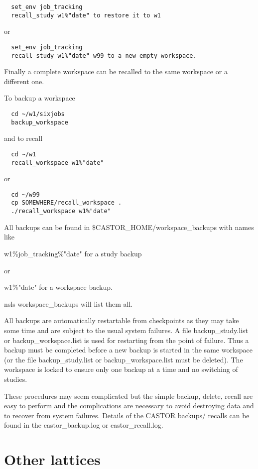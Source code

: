 \documentclass{cernatsnote}    %
\begin{document}
\begin{verbatim}
  set_env job_tracking
  recall_study w1%"date" to restore it to w1 
\end{verbatim}
or 
\begin{verbatim}
  set_env job_tracking
  recall_study w1%"date" w99 to a new empty workspace.
\end{verbatim}

 Finally a complete workspace can be recalled to the same workspace or a
different one.

To backup a workspace
\begin{verbatim} 
  cd ~/w1/sixjobs 
  backup_workspace
\end{verbatim}

and to recall
\begin{verbatim}
  cd ~/w1
  recall_workspace w1%"date"
\end{verbatim}
or 
\begin{verbatim}
  cd ~/w99
  cp SOMEWHERE/recall_workspace .
  ./recall_workspace w1%"date"
\end{verbatim}

 All backups can be found in \$CASTOR\_HOME/workspace\_backups with names like

  w1\%job\_tracking\%"date"     for a study backup
 
or

  w1\%"date"          for a workspace backup.

nsls workspace\_backups will list them all.

 All backups are automatically restartable from checkpoints as they may take
some time and are subject to the usual system failures. A file 
backup\_study.list or backup\_workspace.list is used for restarting
from the point of failure. Thus a backup must be completed before a new
backup is started in the same workspace (or the file backup\_study.list or
backup\_workspace.list must be deleted). The workspace is locked to ensure
only one backup at a time and no switching of studies.

 These procedures may seem complicated but the simple backup, delete, recall
are easy to perform and the complications are necessary to avoid destroying
data and to recover from system failures. Details of the CASTOR backups/
recalls can be found in the castor\_backup.log or castor\_recall.log.

\section{Other lattices}
\label{sec:otherlattices}
\end{document}
